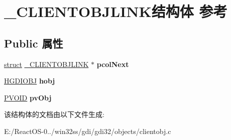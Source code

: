 \hypertarget{struct___c_l_i_e_n_t_o_b_j_l_i_n_k}{}\section{\+\_\+\+C\+L\+I\+E\+N\+T\+O\+B\+J\+L\+I\+N\+K结构体 参考}
\label{struct___c_l_i_e_n_t_o_b_j_l_i_n_k}
\subsection*{Public 属性}
\begin{DoxyCompactItemize}
\item 
\mbox{\label{struct___c_l_i_e_n_t_o_b_j_l_i_n_k_a020dee2d9c857f594b4832109f79ac2a}} 
\hyperlink{interfacestruct}{struct} \hyperlink{struct___c_l_i_e_n_t_o_b_j_l_i_n_k}{\+\_\+\+C\+L\+I\+E\+N\+T\+O\+B\+J\+L\+I\+NK} $\ast$ {\bfseries pcol\+Next}
\item 
\mbox{\label{struct___c_l_i_e_n_t_o_b_j_l_i_n_k_a8ee6f9618b8b06eceb727dd558b393c8}} 
\hyperlink{interfacevoid}{H\+G\+D\+I\+O\+BJ} {\bfseries hobj}
\item 
\mbox{\label{struct___c_l_i_e_n_t_o_b_j_l_i_n_k_a31f87fb9f49ce955b8427047b02922ec}} 
\hyperlink{interfacevoid}{P\+V\+O\+ID} {\bfseries pv\+Obj}
\end{DoxyCompactItemize}


该结构体的文档由以下文件生成\+:\begin{DoxyCompactItemize}
\item 
E\+:/\+React\+O\+S-\/0../win32ss/gdi/gdi32/objects/clientobj.\+c\end{DoxyCompactItemize}
